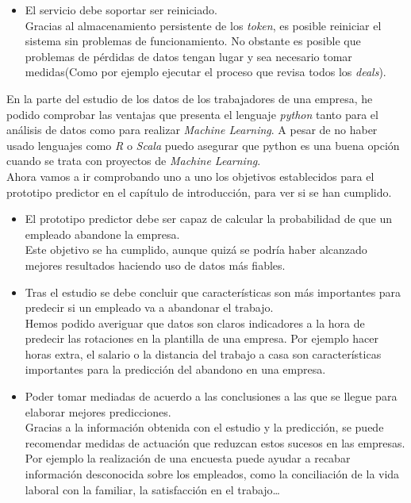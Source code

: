 \begin{itemize}
	\item El servicio debe soportar ser reiniciado.\\
	
	Gracias al almacenamiento persistente de los \textit{token}, es posible reiniciar el sistema sin problemas de funcionamiento. No obstante es posible que problemas de pérdidas de datos tengan lugar y sea necesario tomar medidas(Como por ejemplo ejecutar el proceso que revisa todos los \textit{deals}).

\end{itemize}	

En la parte del estudio de los datos de los trabajadores de una empresa, he podido comprobar las ventajas que presenta el lenguaje \textit{python} tanto para el análisis de datos como para realizar \textit{Machine Learning}.
A pesar de no haber usado lenguajes como \textit{R} o \textit{Scala} puedo asegurar que python es una buena opción cuando se trata con proyectos de \textit{Machine Learning}.\\

Ahora vamos a ir comprobando uno a uno los objetivos establecidos para el prototipo predictor en el capítulo de introducción, para ver si se han cumplido.

\begin{itemize}
	
	\item El prototipo predictor debe ser capaz de calcular la probabilidad de que un empleado abandone la empresa.\\
	
	Este objetivo se ha cumplido, aunque quizá se podría haber alcanzado mejores resultados haciendo uso de datos más fiables.
	\item Tras el estudio se debe concluir que características son más importantes para predecir si un empleado va a abandonar el trabajo.\\
	
	Hemos podido averiguar que datos son claros indicadores a la hora de predecir las rotaciones en la plantilla de una empresa. Por ejemplo hacer horas extra, el salario o la distancia del trabajo a casa son características importantes para la predicción del abandono en una empresa.
	
	\item Poder tomar mediadas de acuerdo a las conclusiones a las que se llegue para elaborar mejores predicciones.\\
	
	Gracias a la información obtenida con el estudio y la predicción, se puede recomendar medidas de actuación que reduzcan estos sucesos en las empresas. Por ejemplo la realización de una encuesta puede ayudar a recabar información desconocida sobre los empleados, como la conciliación de la vida laboral con la familiar, la satisfacción en el trabajo\ldots\\
	
	
\end{itemize}




